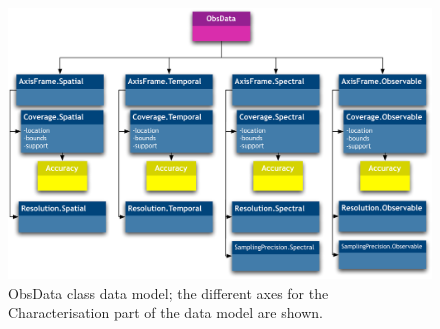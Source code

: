 		
		\begin{figure}[tbp]
		\begin{center}
		\includegraphics[width=\columnwidth]{fig/ObsData-DM}
		\end{center}
		\caption[ObsData class data model]{
			ObsData class data model; the different axes for the
			Characterisation part of the data model are shown.
		}
		\label{figObsData}
		\end{figure}
		
